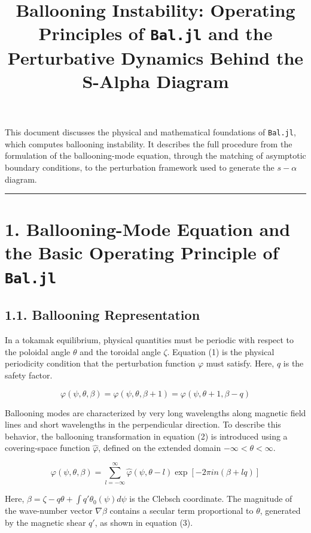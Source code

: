 \documentclass[11pt,a4paper]{article}
\title{Ballooning Instability: Operating Principles of \texttt{Bal.jl} and the Perturbative Dynamics Behind the S-Alpha Diagram}
\author{}
\date{}
\begin{document}
\maketitle

This document discusses the physical and mathematical foundations of \texttt{Bal.jl},
which computes ballooning instability. It describes the full procedure from the
formulation of the ballooning-mode equation, through the matching of asymptotic
boundary conditions, to the perturbation framework used to generate the
\(s-\alpha\) diagram.

\begin{center}\rule{0.5\linewidth}{0.5pt}\end{center}

\section{1. Ballooning-Mode Equation and the Basic Operating Principle of \texttt{Bal.jl}}\label{ballooning-mode-equation-and-basic-operating-principle-of-baljl}

\subsection{1.1. Ballooning Representation}\label{ballooning-representation}

In a tokamak equilibrium, physical quantities must be periodic with respect to the
poloidal angle \(\theta\) and the toroidal angle \(\zeta\). Equation (1) is the
physical periodicity condition that the perturbation function \(\varphi\) must
satisfy. Here, \(q\) is the safety factor.

\[ \varphi(\psi, \theta, \beta) = \varphi(\psi, \theta, \beta + 1) = \varphi(\psi, \theta + 1, \beta - q) \tag{1} \]

Ballooning modes are characterized by very long wavelengths along magnetic field
lines and short wavelengths in the perpendicular direction. To describe this
behavior, the ballooning transformation in equation (2) is introduced using a
covering-space function \(\hat{\varphi}\), defined on the extended domain
\(-\infty < \theta < \infty\).

\[ \varphi(\psi, \theta, \beta) = \sum_{l=-\infty}^{\infty} \hat{\varphi}(\psi, \theta - l) \exp [-2\pi i n (\beta + lq)] \tag{2} \]

Here, \(\beta = \zeta - q\theta + \int q' \theta_0(\psi) d\psi\) is the Clebsch
coordinate. The magnitude of the wave-number vector \(\nabla\beta\) contains a
secular term proportional to \(\theta\), generated by the magnetic shear \(q'\), as
shown in equation (3).
\end{document}
